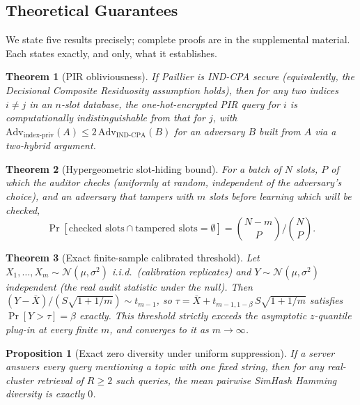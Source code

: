 \documentclass[10pt,journal,compsoc]{IEEEtran}
\newtheorem{theorem}{Theorem}
\newtheorem{proposition}{Proposition}
\begin{document}
\subsection{Theoretical Guarantees}
\label{sec:theory}

We state five results precisely; complete proofs are in the supplemental material. Each states exactly, and only, what it establishes.

\begin{theorem}[PIR obliviousness]
\label{thm:pir}
If Paillier is IND-CPA secure (equivalently, the Decisional Composite Residuosity assumption holds), then for any two indices $i \neq j$ in an $n$-slot database, the one-hot-encrypted PIR query for $i$ is computationally indistinguishable from that for $j$, with $\text{Adv}_{\text{index-priv}}(A) \le 2\,\text{Adv}_{\text{IND-CPA}}(B)$ for an adversary $B$ built from $A$ via a two-hybrid argument.
\end{theorem}

\begin{theorem}[Hypergeometric slot-hiding bound]
\label{thm:hypergeom}
For a batch of $N$ slots, $P$ of which the auditor checks (uniformly at random, independent of the adversary's choice), and an adversary that tampers with $m$ slots before learning which will be checked,
$$\Pr[\text{checked slots} \cap \text{tampered slots} = \emptyset] = \binom{N-m}{P}\Big/\binom{N}{P}.$$
\end{theorem}

\begin{theorem}[Exact finite-sample calibrated threshold]
\label{thm:predquantile}
Let $X_1,\ldots,X_m \sim \mathcal{N}(\mu,\sigma^2)$ i.i.d.\ (calibration replicates) and $Y \sim \mathcal{N}(\mu,\sigma^2)$ independent (the real audit statistic under the null). Then $(Y-\bar X)/(S\sqrt{1+1/m}) \sim t_{m-1}$, so $\tau = \bar X + t_{m-1,1-\beta}\, S\sqrt{1+1/m}$ satisfies $\Pr[Y>\tau]=\beta$ exactly. This threshold strictly exceeds the asymptotic $z$-quantile plug-in at every finite $m$, and converges to it as $m\to\infty$.
\end{theorem}

\begin{proposition}[Exact zero diversity under uniform suppression]
\label{prop:zerodiv}
If a server answers every query mentioning a topic with one fixed string, then for any real-cluster retrieval of $R\ge2$ such queries, the mean pairwise SimHash Hamming diversity is exactly $0$.
\end{proposition}
\end{document}
